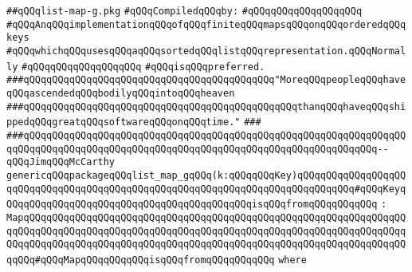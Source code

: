\label{src/lib/src/list-map-g.pkg}
\verb|##qQQqlist-map-g.pkg|\newline
\newline
\verb|#qQQqCompiledqQQqby:|\newline
\verb|#qQQqqQQqqQQqqQQqqQQq|\newline
\newline
\verb|#qQQqAnqQQqimplementationqQQqofqQQqfiniteqQQqmapsqQQqonqQQqorderedqQQqkeys|\newline
\verb|#qQQqwhichqQQqusesqQQqaqQQqsortedqQQqlistqQQqrepresentation.qQQqNormally|\newline
\verb|#qQQqqQQqqQQqqQQqqQQq|\newline
\verb|#qQQqisqQQqpreferred.|\newline
\newline
\newline
\newline
\verb|###qQQqqQQqqQQqqQQqqQQqqQQqqQQqqQQqqQQqqQQqqQQq"MoreqQQqpeopleqQQqhaveqQQqascendedqQQqbodilyqQQqintoqQQqheaven|\newline
\verb|###qQQqqQQqqQQqqQQqqQQqqQQqqQQqqQQqqQQqqQQqqQQqqQQqthanqQQqhaveqQQqshippedqQQqgreatqQQqsoftwareqQQqonqQQqtime."|\newline
\verb|###|\newline
\verb|###qQQqqQQqqQQqqQQqqQQqqQQqqQQqqQQqqQQqqQQqqQQqqQQqqQQqqQQqqQQqqQQqqQQqqQQqqQQqqQQqqQQqqQQqqQQqqQQqqQQqqQQqqQQqqQQqqQQqqQQqqQQqqQQqqQQq--qQQqJimqQQqMcCarthy|\newline
\newline
\newline
\newline
\verb|genericqQQqpackageqQQqlist_map_gqQQq(k:qQQqqQQqKey)qQQqqQQqqQQqqQQqqQQqqQQqqQQqqQQqqQQqqQQqqQQqqQQqqQQqqQQqqQQqqQQqqQQqqQQqqQQqqQQq#qQQqKeyqQQqqQQqqQQqqQQqqQQqqQQqqQQqqQQqqQQqqQQqqQQqisqQQqfromqQQqqQQqqQQq|\newline
\verb|:|\newline
\verb|MapqQQqqQQqqQQqqQQqqQQqqQQqqQQqqQQqqQQqqQQqqQQqqQQqqQQqqQQqqQQqqQQqqQQqqQQqqQQqqQQqqQQqqQQqqQQqqQQqqQQqqQQqqQQqqQQqqQQqqQQqqQQqqQQqqQQqqQQqqQQqqQQqqQQqqQQqqQQqqQQqqQQqqQQqqQQqqQQqqQQqqQQqqQQqqQQqqQQqqQQqqQQqqQQqqQQq#qQQqMapqQQqqQQqqQQqisqQQqfromqQQqqQQqqQQq|\newline
\verb|where|\newline
